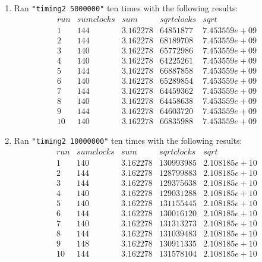 \documentclass[12pt,fleqn,leqno,letterpaper]{article}
\begin{document}
\begin{enumerate}
    \item Ran \texttt{"timing2 5000000"} ten times with the following
        results:\\
        $$
        \begin{array}{lcccc}
            run & sum clocks & sum & sqrt clocks & sqrt \\
            1 & 144 & 3.162278 & 64851877 & 7.453559e+09 \\
            2 & 144 & 3.162278 & 68189708 & 7.453559e+09 \\
            3 & 140 & 3.162278 & 65772986 & 7.453559e+09 \\
            4 & 140 & 3.162278 & 64225261 & 7.453559e+09 \\
            5 & 144 & 3.162278 & 66887858 & 7.453559e+09 \\
            6 & 140 & 3.162278 & 65289854 & 7.453559e+09 \\
            7 & 144 & 3.162278 & 64459362 & 7.453559e+09 \\
            8 & 140 & 3.162278 & 64458638 & 7.453559e+09 \\
            9 & 144 & 3.162278 & 64603720 & 7.453559e+09 \\
            10 & 140 & 3.162278 & 66835988 & 7.453559e+09
        \end{array}
        $$

    \item Ran \texttt{"timing2 10000000"} ten times with the following
        results:\\
        $$
        \begin{array}{lcccc}
            run & sum clocks & sum & sqrt clocks & sqrt \\
            1 & 140 & 3.162278 & 130993985 & 2.108185e+10 \\
            2 & 144 & 3.162278 & 128799883 & 2.108185e+10 \\
            3 & 144 & 3.162278 & 129375638 & 2.108185e+10 \\
            4 & 140 & 3.162278 & 129031288 & 2.108185e+10 \\
            5 & 140 & 3.162278 & 131155445 & 2.108185e+10 \\
            6 & 144 & 3.162278 & 130016120 & 2.108185e+10 \\
            7 & 140 & 3.162278 & 131313273 & 2.108185e+10 \\
            8 & 144 & 3.162278 & 131039483 & 2.108185e+10 \\
            9 & 148 & 3.162278 & 130911335 & 2.108185e+10 \\
            10 & 144 & 3.162278 & 131578104 & 2.108185e+10
        \end{array}
        $$


\end{enumerate}
\end{document}

